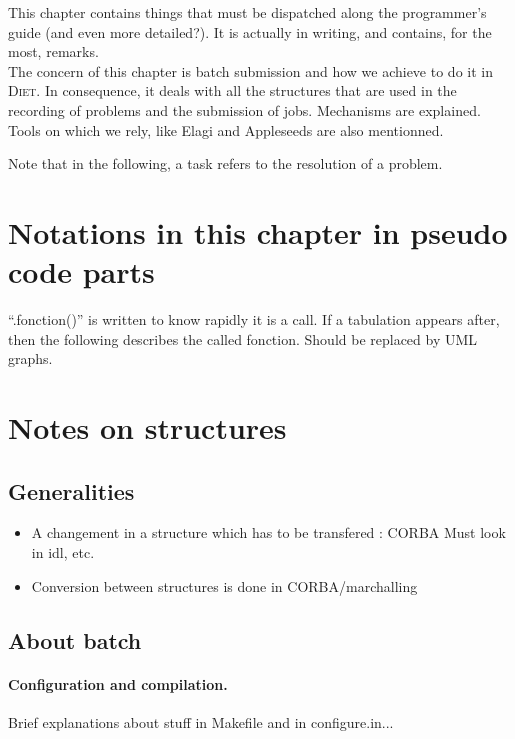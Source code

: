 This chapter contains things that must be dispatched along the
programmer's guide (and even more detailed?). It is actually in
writing, and contains, for the most, remarks.\\

The concern of this chapter is batch submission and how we achieve to
do it in \textsc{Diet}. In consequence, it deals with all the
structures that are used in the recording of problems and the
submission of jobs. Mechanisms are explained. Tools on which we rely,
like Elagi and Appleseeds are also mentionned.

Note that in the following, a task refers to the resolution of a
problem.

\section{Notations in this chapter in pseudo code parts}

``.fonction()'' is written to know rapidly it is a call. If a
tabulation appears after, then the following describes the called
fonction. Should be replaced by UML graphs.

\section{Notes on structures}

\subsection{Generalities}
\begin{itemize}
\item A changement in a structure which has to be transfered : CORBA
Must look in idl, etc.

\item Conversion between structures is done in CORBA/marchalling
\end{itemize}

\subsection{About batch}

\paragraph{Configuration and compilation.}$ $\\
Brief explanations about stuff in Makefile and in configure.in...\\

